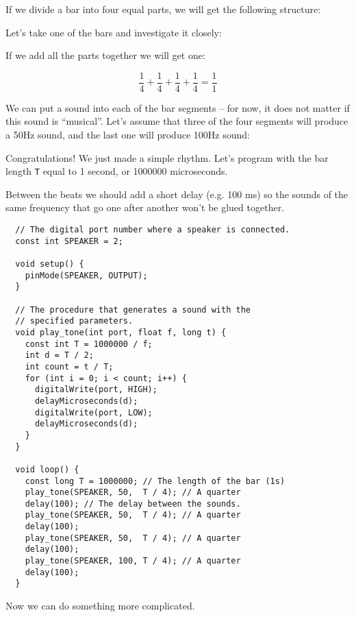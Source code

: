 \documentclass[../sparc.tex]{subfiles}
\begin{document}
If we divide a bar into four equal parts, we will get the following structure:


Let's take one of the bars and investigate it closely:


If we add all the parts together we will get one:

\begin{equation}
  \frac{1}{4} + \frac{1}{4} + \frac{1}{4} + \frac{1}{4} = \frac{1}{1}
\end{equation}

We can put a sound into each of the bar segments -- for now, it does not matter
if this sound is ``musical''.  Let's assume that three of the four segments will
produce a 50\gls{Hz} sound, and the last one will produce 100Hz sound:


Congratulations!  We just made a simple rhythm.  Let's program with the bar
length \texttt{T} equal to 1 second, or 1000000 microseconds.

Between the beats we should add a short delay (e.g. 100 ms) so the sounds of the
same frequency that go one after another won't be glued together.

\begin{verbatim}
  // The digital port number where a speaker is connected.
  const int SPEAKER = 2;

  void setup() {
    pinMode(SPEAKER, OUTPUT);
  }

  // The procedure that generates a sound with the
  // specified parameters.
  void play_tone(int port, float f, long t) {
    const int T = 1000000 / f;
    int d = T / 2;
    int count = t / T;
    for (int i = 0; i < count; i++) {
      digitalWrite(port, HIGH);
      delayMicroseconds(d);
      digitalWrite(port, LOW);
      delayMicroseconds(d);
    }
  }

  void loop() {
    const long T = 1000000; // The length of the bar (1s)
    play_tone(SPEAKER, 50,  T / 4); // A quarter
    delay(100); // The delay between the sounds.
    play_tone(SPEAKER, 50,  T / 4); // A quarter
    delay(100);
    play_tone(SPEAKER, 50,  T / 4); // A quarter
    delay(100);
    play_tone(SPEAKER, 100, T / 4); // A quarter
    delay(100);
  }
\end{verbatim}

Now we can do something more complicated.
\end{document}
